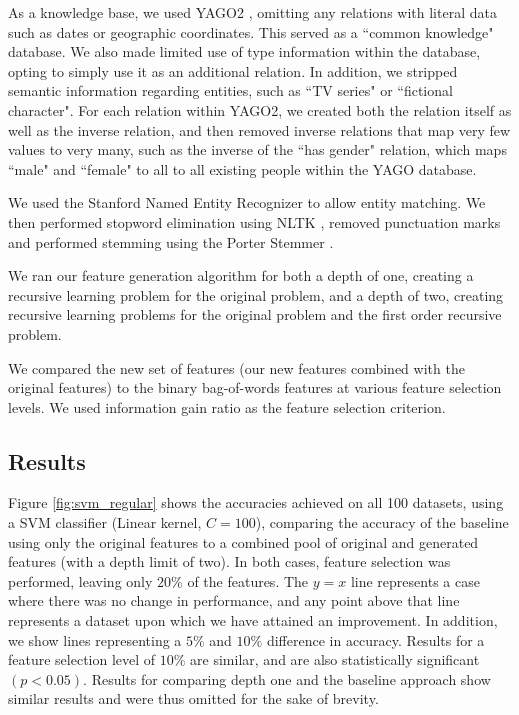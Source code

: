 \documentclass[twoside,11pt]{article}
\theoremstyle{definition}
\begin{document}
As a knowledge base, we used YAGO2 \cite{hoffart2013yago2}, omitting any relations with literal data such as dates or geographic coordinates. This served as a ``common knowledge" database. We also made limited use of type information within the database, opting to simply use it as an additional relation.
In addition, we stripped semantic information regarding entities, such as ``TV series" or ``fictional character". For each relation within YAGO2, we created both the relation itself as well as the inverse relation, and then removed inverse relations that map very few values to very many, such as the inverse of the ``has gender" relation, which maps ``male" and ``female" to all to all existing people within the YAGO database.

We used the Stanford Named Entity Recognizer \cite{finkel2005incorporatingfull} to allow entity matching. We then performed stopword elimination using NLTK \cite{bird2009natural} , removed punctuation marks and performed stemming using the Porter Stemmer \cite{van1980new}.

We ran our feature generation algorithm for both a depth of one, creating a recursive learning problem for the original problem, and a depth of two, creating recursive learning problems for the original problem and the first order recursive problem.

We compared the new set of features (our new features combined with the original features) to the binary bag-of-words features at various feature selection levels. We used information gain ratio as the feature selection criterion.


\subsection{Results}
Figure \ref{fig:svm_regular} shows the accuracies achieved on all 100 datasets, using a SVM \cite{cortes1995support} classifier (Linear kernel, $C=100$), comparing the accuracy of the baseline using only the original features to a combined pool of original and generated features (with a depth limit of two). In both cases, feature selection was performed, leaving only $20\%$ of the features. The $y=x$ line represents a case where there was no change in performance, and any point above that line represents a dataset upon which we have attained an improvement. In addition, we show lines representing a $5\%$ and $10\%$ difference in accuracy. Results for a feature selection level of $10\%$ are similar, and are also statistically significant $(p<0.05)$. Results for comparing depth one and the baseline approach show similar results and were thus omitted for the sake of brevity.
\end{document}
